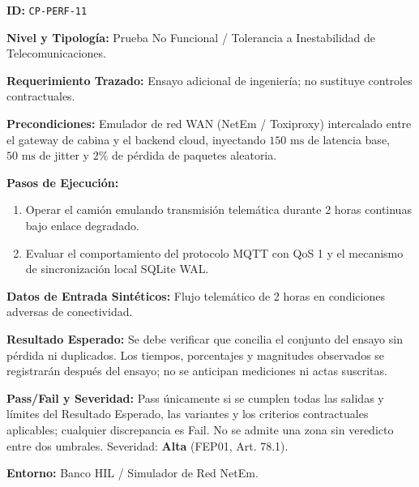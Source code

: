 \par\noindent\textbf{ID:} \texttt{C\allowbreak{}P\allowbreak{}-\allowbreak{}P\allowbreak{}E\allowbreak{}R\allowbreak{}F\allowbreak{}-\allowbreak{}1\allowbreak{}1\allowbreak{}}\par
\par\noindent\textbf{Nivel y Tipología:} Prueba No Funcional / Tolerancia a Inestabilidad de Telecomunicaciones.\par
\par\noindent\textbf{Requerimiento Trazado:} Ensayo adicional de ingeniería; no sustituye controles contractuales.\par
\par\noindent\textbf{Precondiciones:} Emulador de red WAN (NetEm / Toxiproxy) intercalado entre el gateway de cabina y el backend cloud, inyectando \(150\text{ ms}\) de latencia base, \(50\text{ ms}\) de jitter y \(2\%\) de pérdida de paquetes aleatoria.\par
\par\noindent\textbf{Pasos de Ejecución:} \par
\begin{enumerate}
\item Operar el camión emulando transmisión telemática durante 2 horas continuas bajo enlace degradado.
\item Evaluar el comportamiento del protocolo MQTT con QoS 1 y el mecanismo de sincronización local SQLite WAL.
\end{enumerate}
\par\noindent\textbf{Datos de Entrada Sintéticos:} Flujo telemático de 2 horas en condiciones adversas de conectividad.\par
\par\noindent\textbf{Resultado Esperado:} Se debe verificar que concilia el conjunto del ensayo sin pérdida ni duplicados. Los tiempos, porcentajes y magnitudes observados se registrarán después del ensayo; no se anticipan mediciones ni actas suscritas.\par
\par\noindent\textbf{Pass/Fail y Severidad:} Pass únicamente si se cumplen todas las salidas y límites del Resultado Esperado, las variantes y los criterios contractuales aplicables; cualquier discrepancia es Fail. No se admite una zona sin veredicto entre dos umbrales. Severidad: \textbf{Alta} (FEP01, Art. 78.1).\par
\par\noindent\textbf{Entorno:} Banco HIL / Simulador de Red NetEm.\par






